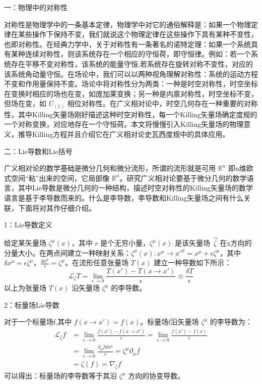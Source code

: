 
一：物理中的对称性

对称性是物理学中的一条基本定律，物理学中对它的通俗解释是：如果一个物理定律在某些操作下保持不变，我们就说这个物理定律在这些操作下具有某种不变性，也即对称性。在经典力学中，关于对称性有一条著名的诺特定理：如果一个系统具有某种连续对称性，则该系统存在一个相应的守恒荷，即守恒律。例如：若一个系统存在平移不变对称性，该系统的能量守恒;若系统存在旋转对称不变性，对应的该系统角动量守恒。在场论中，我们可以以两种视角理解对称性：系统的运动方程不变和作用量保持不变。场论中将对称性分为两类：一种是时空对称性，时空坐标在变换时相应的场也在变，如庞加莱变换；另一种是内禀对称性，时空坐标不变，但场在变，如 $U_{(1)}$ 相位对称性。在广义相对论中，时空几何存在一种重要的对称性，其中Killing矢量场刚好描述这种时空对称性，每一个Killing矢量场确定度规的一个对称变换，对应地存在一个守恒荷。本文将慢慢引入Killing矢量场的物理意义，推导Killing方程并且介绍它在广义相对论史瓦西度规中的具体应用。

 二：Lie导数和Lie括号

广义相对论的数学基础是微分几何和微分流形，所谓的流形就是可用 $\mathbb{R}^{n}$ 即n维欧式空间“粘”出来的空间，它局部像 $\mathbb{R}^{n}$。研究广义相对论要基于微分几何的数学语言，其中Lie导数是微分几何的一种结构，描述时空对称性的Killing矢量场的数学语言是基于李导数而来的。什么是李导数，李导数和Killing矢量场之间有什么关联，下面将对其作仔细介绍。

1：Lie导数定义

给定某矢量场 $\zeta^{\mu}(x)$，其中 $\epsilon$ 是个无穷小量，$\zeta^{\mu}(x)$ 是该矢量场 $\overrightarrow{\zeta}$ 在x方向的分量大小。在两点间建立一种映射关系：$\zeta^{\mu}(x):x^{\mu}\rightarrow x'^{\mu}=x^{\mu}+\epsilon\zeta^{\mu}$，其中 $\delta x^{\mu}=\epsilon\zeta^{\mu}$，$\frac{d x^{\mu}}{\epsilon}=\zeta^{\mu}$。在流形任意张量场 $T(x)$ 建立一种导数如下所示：
\begin{equation}
\mathcal{L}_{\zeta}T=\lim_{\epsilon\rightarrow0}\frac{T(x')-T(x\rightarrow x')}{\epsilon}\equiv \frac{\delta T}{\epsilon}
\end{equation}
以上为张量场 $T(x)$ 沿矢量场 $\zeta^{\mu}$ 的李导数。

2：标量场Lie导数

对于一个标量场f,其中 $f(x\rightarrow x')=f(x)$。标量场f沿矢量场 $\zeta^{\mu}$ 的李导数为：
$$\begin{aligned}
\mathcal{L}_{\zeta} f &=\lim _{\epsilon \rightarrow 0} \frac{f(x')-f(x \rightarrow x')}{\epsilon}=\lim _{\epsilon \rightarrow 0} \frac{f(x')-f(x)}{\epsilon} \\
&=\lim _{\epsilon\rightarrow 0} \frac{\partial_{\mu} fd x^{\mu}}{\epsilon}=\zeta^{\mu}\partial_{\mu}f \\
&=\zeta(f)=\nabla_{\zeta}f
\end{aligned}$$
可以得出：标量场的李导数等于其沿 $\zeta^{\mu}$ 方向的协变导数。

